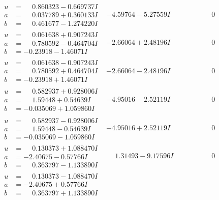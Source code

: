 \documentclass[1p]{elsarticle_modified}
\theoremstyle{definition}
\begin{document}
$$\begin{array}{c|c|c}
\begin{aligned}
u &= \phantom{-}0.860323 - 0.669737 I \\
a &= \phantom{-}0.037789 + 0.360133 I \\
b &= \phantom{-}0.461677 - 1.274220 I\end{aligned}
 & -4.59764 - 5.27559 I & \phantom{-0.000000 } 0 \\ \hline\begin{aligned}
u &= \phantom{-}0.061638 + 0.907243 I \\
a &= \phantom{-}0.780592 - 0.464704 I \\
b &= -0.23918 - 1.46071 I\end{aligned}
 & -2.66064 + 2.48196 I & \phantom{-0.000000 } 0 \\ \hline\begin{aligned}
u &= \phantom{-}0.061638 - 0.907243 I \\
a &= \phantom{-}0.780592 + 0.464704 I \\
b &= -0.23918 + 1.46071 I\end{aligned}
 & -2.66064 - 2.48196 I & \phantom{-0.000000 } 0 \\ \hline\begin{aligned}
u &= \phantom{-}0.582937 + 0.928006 I \\
a &= \phantom{-}1.59448 + 0.54639 I \\
b &= -0.035069 + 1.059860 I\end{aligned}
 & -4.95016 - 2.52119 I & \phantom{-0.000000 } 0 \\ \hline\begin{aligned}
u &= \phantom{-}0.582937 - 0.928006 I \\
a &= \phantom{-}1.59448 - 0.54639 I \\
b &= -0.035069 - 1.059860 I\end{aligned}
 & -4.95016 + 2.52119 I & \phantom{-0.000000 } 0 \\ \hline\begin{aligned}
u &= \phantom{-}0.130373 + 1.088470 I \\
a &= -2.40675 - 0.57766 I \\
b &= \phantom{-}0.363797 - 1.133890 I\end{aligned}
 & \phantom{-}1.31493 - 9.17596 I & \phantom{-0.000000 } 0 \\ \hline\begin{aligned}
u &= \phantom{-}0.130373 - 1.088470 I \\
a &= -2.40675 + 0.57766 I \\
b &= \phantom{-}0.363797 + 1.133890 I\end{aligned}

\end{array}$$
\end{document}
